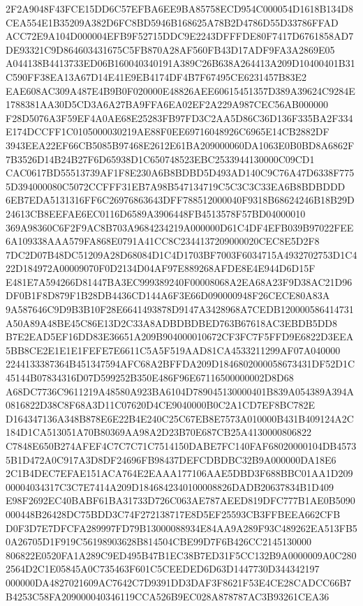\documentclass[UTF8,fontset=fandol,zihao=-4,a4paper]{ctexart}
\begin{document}
{{2F2A9048F43FCE15DD6C57EFBA6EE9BA85758ECD954C000054D1618B134D8CEA554E1B35209A382D6FC8BD5946B168625A78B2D4786D55D33786FFAD
ACC72E9A104D000004EFB9F52715DDC9E2243DFFFDE80F7417D6761858AD7DE93321C9D864603431675C5FB870A28AF560FB43D17ADF9FA3A2869E05
A044138B4413733ED06B160040340191A389C26B638A264413A209D10400401B31C590FF38EA13A67D14E41E9EB4174DF4B7F67495CE6231457B83E2
EAE608AC309A487E4B9B0F020000E48826AEE60615451357D389A39624C9284E1788381AA30D5CD3A6A27BA9FFA6EA02EF2A229A987CEC56AB000000
F28D5076A3F59EF4A0AE68E25283FB97FD3C2AA5D86C36D136F335BA2F334E174DCCFF1C0105000030219AE88F0EE69716048926C6965E14CB2882DF
3943EEA22EF66CB5085B97468E2612E61BA209000060DA1063E0B0BD8A6862F7B3526D14B24B27F6D65938D1C650748523EBC2533944130000C09CD1
CAC0617BD55513739AF1F8E230A6B8BDBD5D493AD140C9C76A47D6338F7755D394000080C5072CCFFF31EB7A98B547134719C5C3C3C33EA6B8BDBDDD
6EB7EDA5131316FF6C26976863643DFF788512000040F9318B68624246B18B29D24613CB8EEFAE6EC0116D6589A3906448FB4513578F57BD04000010
369A98360C6F2F9AC8B703A9684234219A000000D61C4DF4EFB039B97022FEE6A109338AAA579FA868E0791A41CC8C2344137209000020CEC8E5D2F8
7DC2D07B48DC51209A28D68084D1C4D1703BF7003F6034715A4932702753D1C422D184972A00009070F0D2134D04AF97E889268AFDE8E4E944D6D15F
E481E7A594266D81447BA3EC999389240F00008068A2EA68A23F9D38AC21D96DF0B1F8D879F1B28DB4436CD144A6F3E66D090000948F26CECE80A83A
9A587646C9D9B3B10F28E6641493878D9147A3428968A7CEDB120000586414731A50A89A48BE45C86E13D2C33A8ADBDBDBED763B67618AC3EBDB5DD8
B7E2EAD5EF16DD83E36651A209B904000010672CF3FC7F5FFD9E6822D3EEA5BB8CE2E1E1E1FEFE7E6611C5A5F519AAD81CA4533211299AF07A040000
2244133387364B451347594AFC68A2BFFDA209D1846802000058673431DF52D1C45144B07834316D07D599252B350E486F96E67116500000002D8D68
A68DC7736C9611219A48580A923BA6104D789045130000401B839A054389A394A0816822D38C8F68A3D11C07620D4CE9040000B0C2A1CD7EF8BC782E
D164347136A348B878E6E22B4E240C25C67EB8E7573A010000B431B409124A2C184D1CA513051A70B80369AA98A2D23B70E687CB25A4130000806822
C7848E650B274AFEF4C7C7C71C7514150DABE7FC140FAF68020000104DB45735B1D472A0C917A3D8DF24696FB98437DEFCDBDBC32B9A000000DA18E6
2C1B4DEC7EFAE151ACA764E2EAAA177106AAE5DBD3F688BBC01AA1D20900004034317C3C7E7414A209D1846842340100008826DADB20637834B1D409
E98F2692EC40BABF61BA31733D726C063AE787AEED819DFC777B1AE0B5090000448B26428DC75BDD3C74F272138717E8D5EF25593CB3FFBEEA662CFB
D0F3D7E7DFCFA289997FD79B13000088934E84AA9A289F93C489262EA513FB50A26705D1F919C56198903628B814504CBE99D7F6B426CC2145130000
806822E0520FA1A289C9ED495B47B1EC38B7ED31F5CC132B9A0000009A0C2802564D2C1E05845A0C735463F601C5CEEDED6D63D1447730D344342197
000000DA4827021609AC7642C7D9391DD3DAF3F8621F53E4CE28CADCC66B7B4253C58FA209000040346119CCA526B9EC028A878787AC3B93261CEA36
}}
\end{document}
